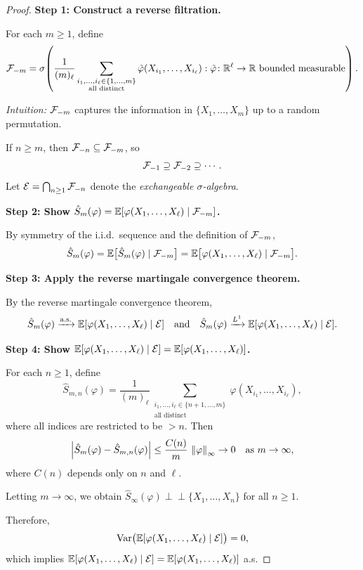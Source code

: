 \begin{proof}
    \textbf{Step 1: Construct a reverse filtration.}

    For each $m \geq 1$, define
    \[
        \mathcal{F}_{-m} = \sigma\!\left(\frac{1}{(m)_\ell} \sum_{\substack{i_1, \ldots, i_\ell \in \{1, \ldots, m\} \\ \text{all distinct}}} \tilde{\varphi}(X_{i_1}, \ldots, X_{i_\ell}) : \tilde{\varphi} \colon \mathbb{R}^\ell \to \mathbb{R} \text{ bounded measurable}\right).
    \]

    \textit{Intuition:} $\mathcal{F}_{-m}$ captures the information in $\{X_1, \ldots, X_m\}$ up to a random permutation.

    \medskip
    If $n \geq m$, then $\mathcal{F}_{-n} \subseteq \mathcal{F}_{-m}$, so
    \[
        \mathcal{F}_{-1} \supseteq \mathcal{F}_{-2} \supseteq \cdots.
    \]
    Let $\mathcal{E} = \bigcap_{n \geq 1} \mathcal{F}_{-n}$ denote the \emph{exchangeable $\sigma$-algebra}.

    \medskip
    \textbf{Step 2: Show $\hat{S}_m(\varphi) = \mathbb{E}[\varphi(X_1, \ldots, X_\ell) \mid \mathcal{F}_{-m}]$.}

    By symmetry of the i.i.d.\ sequence and the definition of $\mathcal{F}_{-m}$,
    \[
        \hat{S}_m(\varphi) = \mathbb{E}\bigl[\hat{S}_m(\varphi) \mid \mathcal{F}_{-m}\bigr] = \mathbb{E}\bigl[\varphi(X_1, \ldots, X_\ell) \mid \mathcal{F}_{-m}\bigr].
    \]

    \medskip
    \textbf{Step 3: Apply the reverse martingale convergence theorem.}

    By the reverse martingale convergence theorem,
    \[
        \hat{S}_m(\varphi) \xrightarrow{\text{a.s.}} \mathbb{E}[\varphi(X_1, \ldots, X_\ell) \mid \mathcal{E}] \quad \text{and} \quad \hat{S}_m(\varphi) \xrightarrow{L^{1}} \mathbb{E}[\varphi(X_1, \ldots, X_\ell) \mid \mathcal{E}].
    \]

    \medskip
    \textbf{Step 4: Show $\mathbb{E}[\varphi(X_1, \ldots, X_\ell) \mid \mathcal{E}] = \mathbb{E}[\varphi(X_1, \ldots, X_\ell)]$.}

    For each $n \geq 1$, define
    \[
        \hat{S}_{m,n}(\varphi) = \frac{1}{(m)_\ell} \sum_{\substack{i_1, \ldots, i_\ell \in \{n+1, \ldots, m\} \\ \text{all distinct}}} \varphi(X_{i_1}, \ldots, X_{i_\ell}),
    \]
    where all indices are restricted to be $> n$. Then
    \[
        \left|\hat{S}_m(\varphi) - \hat{S}_{m,n}(\varphi)\right| \leq \frac{C(n)}{m}\,\left\|\varphi\right\|_\infty \to 0 \quad \text{as } m \to \infty,
    \]
    where $C(n)$ depends only on $n$ and $\ell$.

    Letting $m \to \infty$, we obtain $\hat{S}_\infty(\varphi) \perp\!\!\!\perp \{X_1, \ldots, X_n\}$ for all $n \geq 1$.

    \medskip
    Therefore,
    \[
        \operatorname{Var}\bigl(\mathbb{E}[\varphi(X_1, \ldots, X_\ell) \mid \mathcal{E}]\bigr) = 0,
    \]
    which implies $\mathbb{E}[\varphi(X_1, \ldots, X_\ell) \mid \mathcal{E}] = \mathbb{E}[\varphi(X_1, \ldots, X_\ell)]$ a.s.
\end{proof}
